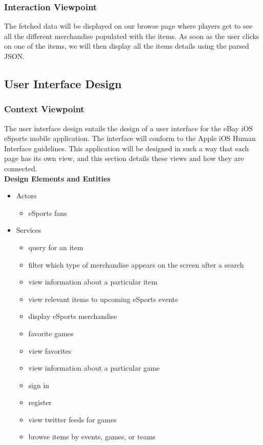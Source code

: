 \documentclass[onecolumn, draftclsnofoot,10pt, compsoc]{IEEEtran}
\begin{document}
\subsubsection{Interaction Viewpoint}
The fetched data will be displayed on our browse page where players get to see all the different merchandise populated with the items. As soon as the user clicks on one of the items, we will then display all the items details using the parsed JSON. 
\subsection{User Interface Design}

\subsubsection{Context Viewpoint}
    The user interface design entails the design of a user interface for the eBay iOS eSports mobile application. The interface will conform to the Apple iOS Human Interface guidelines. This application will be designed in such a way that each page has its own view, and this section details these views and how they are connected.\\
     \indent\textbf{Design Elements and Entities}
     \begin{itemize}
     \item Actors
       \begin{itemize}
       \item eSports fans 
        \end{itemize}
       
     \item Services
      \begin{itemize}
      \item query for an item
      \item filter which type of merchandise appears on the screen after a search 
      \item view information about a particular item 
      \item view relevant items to upcoming eSports events
      \item display eSports merchandise
      \item favorite games
      \item view favorites
      \item view information about a particular game 
      \item sign in
      \item register 
      \item view twitter feeds for games
      \item browse items by events, games, or teams
       \end{itemize}
       \end{itemize}
       
\end{document}
